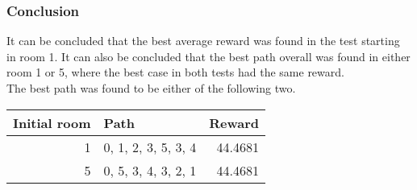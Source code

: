 \documentclass[../Head/Main.tex]{subfiles}
\begin{document}
\subsubsection{Conclusion}
It can be concluded that the best average reward was found in the test starting in room 1. It can also be concluded that the best path overall was found in either room 1 or 5, where the best case in both tests had the same reward.\\
The best path was found to be either of the following two.\par 
\begin{minipage}[b]{\textwidth}
	\centering
	\begin{tabular}{r l r}
	\hline
	\multicolumn{1}{l}{\textbf{Initial room}} & \textbf{Path} & \textbf{Reward} \\ 			\hline
	1  & 0, 1, 2, 3, 5, 3, 4  & 44.4681\\
	5  & 0, 5, 3, 4, 3, 2, 1  & 44.4681\\
	\hline
\end{tabular}
\end{minipage}
\end{document}
